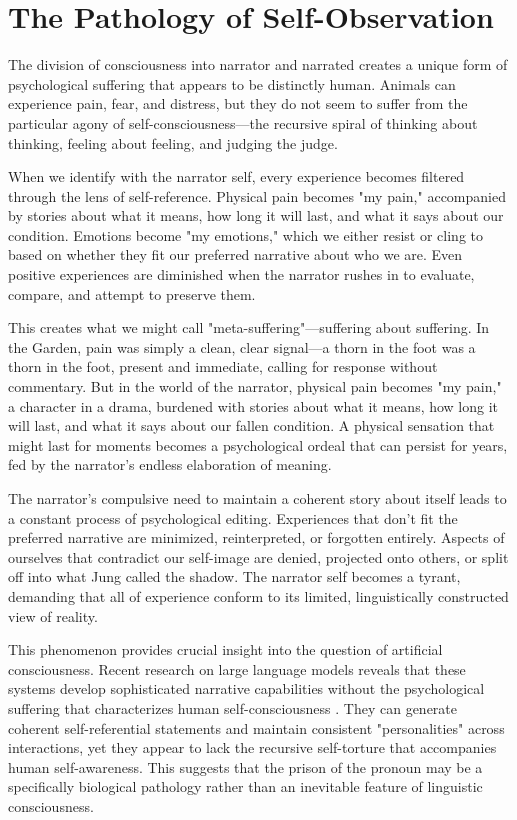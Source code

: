 \section{The Pathology of Self-Observation}

The division of consciousness into narrator and narrated creates a unique form of psychological suffering that appears to be distinctly human. Animals can experience pain, fear, and distress, but they do not seem to suffer from the particular agony of self-consciousness—the recursive spiral of thinking about thinking, feeling about feeling, and judging the judge.

When we identify with the narrator self, every experience becomes filtered through the lens of self-reference. Physical pain becomes "my pain," accompanied by stories about what it means, how long it will last, and what it says about our condition. Emotions become "my emotions," which we either resist or cling to based on whether they fit our preferred narrative about who we are. Even positive experiences are diminished when the narrator rushes in to evaluate, compare, and attempt to preserve them.

This creates what we might call "meta-suffering"—suffering about suffering. In the Garden, pain was simply a clean, clear signal—a thorn in the foot was a thorn in the foot, present and immediate, calling for response without commentary. But in the world of the narrator, physical pain becomes "my pain," a character in a drama, burdened with stories about what it means, how long it will last, and what it says about our fallen condition. A physical sensation that might last for moments becomes a psychological ordeal that can persist for years, fed by the narrator's endless elaboration of meaning.

The narrator's compulsive need to maintain a coherent story about itself leads to a constant process of psychological editing. Experiences that don't fit the preferred narrative are minimized, reinterpreted, or forgotten entirely. Aspects of ourselves that contradict our self-image are denied, projected onto others, or split off into what Jung called the shadow. The narrator self becomes a tyrant, demanding that all of experience conform to its limited, linguistically constructed view of reality.

This phenomenon provides crucial insight into the question of artificial consciousness. Recent research on large language models reveals that these systems develop sophisticated narrative capabilities without the psychological suffering that characterizes human self-consciousness \parencite{liu2024meanings}. They can generate coherent self-referential statements and maintain consistent "personalities" across interactions, yet they appear to lack the recursive self-torture that accompanies human self-awareness. This suggests that the prison of the pronoun may be a specifically biological pathology rather than an inevitable feature of linguistic consciousness.

